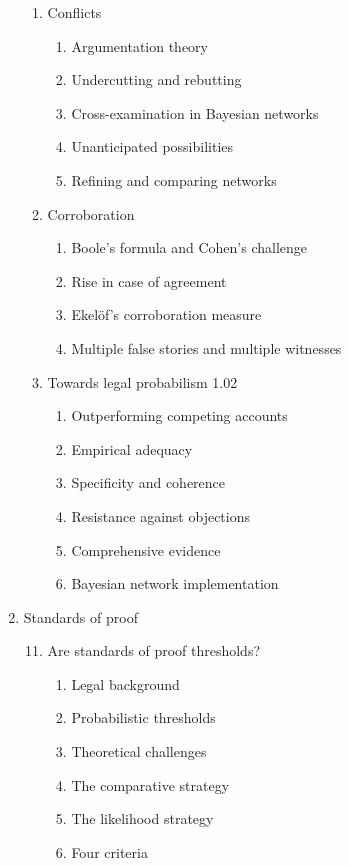 \documentclass[
  10pt,
  dvipsnames,enabledeprecatedfontcommands]{scrartcl}
\begin{document}
\begin{multicols}{2}
\begin{enumerate}
\begin{enumerate}
  
  \item Conflicts
  \begin{enumerate}
  \item Argumentation theory
  \item Undercutting and rebutting 
  \item Cross-examination in Bayesian networks
  \item Unanticipated possibilities
  \item Refining and comparing  networks
  \end{enumerate}
 
 
  \item Corroboration
  \begin{enumerate}
  \item Boole's formula and Cohen's challenge
  \item Rise in case of agreement
  \item Ekel\"of's corroboration measure 
  \item Multiple false stories and multiple witnesses
  \end{enumerate}


  \item  Towards legal probabilism 1.02
    \begin{enumerate}
    \item Outperforming competing accounts
    \item Empirical adequacy
    \item Specificity and coherence
    \item Resistance against objections 
    \item Comprehensive evidence
    \item Bayesian network implementation
    \end{enumerate}


\end{enumerate}
\item  Standards of proof
\begin{enumerate}


\setcounter{enumii}{10}
 \item  Are standards of proof thresholds?
  \begin{enumerate}
  \item  Legal background
  \item  Probabilistic thresholds
  \item  Theoretical challenges
  \item  The comparative strategy
  \item  The likelihood strategy
  \item Four criteria 
  \end{enumerate}



\end{enumerate}
\end{enumerate}
\end{multicols}
\end{document}
